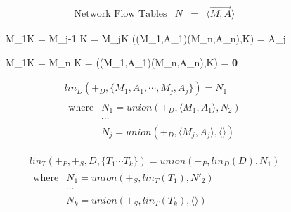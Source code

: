 \begin{figure}[t]

\begin{displaymath}
\begin{array}{lrcl}
\textrm{Network Flow Tables} & N & = & \langle \overrightarrow{M,A} \rangle
\end{array}
\end{displaymath}


\medskip

\inference
{M_1\cap K = \emptyset \cdots M_{j-1} \cap K = \emptyset \qquad
 M_j\cap K \ne \emptyset }
{(\langle(M_1,A_1)\cdots(M_n,A_n)\rangle,K) = A_j}

\medskip

\inference
{M_1\cap K = \emptyset \cdots M_{n} \cap K = \emptyset}
{(\langle(M_1,A_1)\cdots(M_n,A_n)\rangle,K) = \textbf{0}}

\medskip

\begin{displaymath}
\begin{array}{l}
\mathit{lin}_D\left(+_D,\{M_1,A_1, \cdots, M_j,A_j \}\right) 
  = N_1 \\
\begin{array}{lllll}
\textrm{where} 
& N_1 = \mathit{union}(+_D,\langle M_1,A_1\rangle, N_2) \\
& \cdots \\
& N_j = \mathit{union}(+_D, \langle M_j,A_j\rangle, \langle\rangle)
\end{array}
\end{array}
\end{displaymath}

\begin{displaymath}
\begin{array}{l}
\mathit{lin}_T\left(+_P,+_S,D, \{T_1\cdots T_k\}\right)
  = \mathit{union}(+_P,\mathit{lin}_D(D), N_1) \\
\begin{array}{lllll}
\textrm{where} 
& N_1 = \mathit{union}(+_S, \mathit{lin}_T(T_1), N'_2) \\
& \cdots \\
& N_k = \mathit{union}(+_S,\mathit{lin}_T(T_k), \langle \rangle)
\end{array}
\end{array}
\end{displaymath}


\end{figure}

